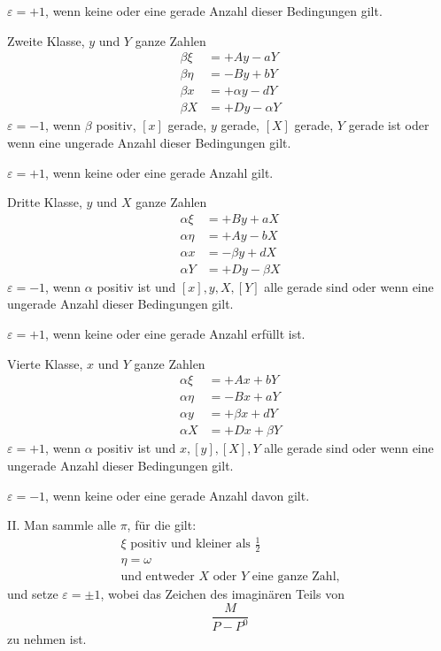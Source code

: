 $\varepsilon=+1$, wenn keine oder eine gerade Anzahl dieser Bedingungen gilt.

Zweite Klasse, $y$ und $Y$ ganze Zahlen
\[
\begin{aligned}
\beta\xi&=+Ay-aY\\
\beta\eta&=-By+bY\\
\beta x&=+\alpha y-dY\\
\beta X&=+Dy-\alpha Y
\end{aligned}
\]
$\varepsilon=-1$, wenn $\beta$ positiv, $[x]$ gerade, $y$ gerade, $[X]$ gerade, $Y$ gerade ist oder wenn eine ungerade Anzahl dieser Bedingungen gilt.

$\varepsilon=+1$, wenn keine oder eine gerade Anzahl gilt.

Dritte Klasse, $y$ und $X$ ganze Zahlen
\[
\begin{aligned}
\alpha\xi&=+By+aX\\
\alpha\eta&=+Ay-bX\\
\alpha x&=-\beta y+dX\\
\alpha Y&=+Dy-\beta X
\end{aligned}
\]
$\varepsilon=-1$, wenn $\alpha$ positiv ist und $[x],y,X,[Y]$ alle gerade sind oder wenn eine ungerade Anzahl dieser Bedingungen gilt.

$\varepsilon=+1$, wenn keine oder eine gerade Anzahl erfüllt ist.

Vierte Klasse, $x$ und $Y$ ganze Zahlen
\[
\begin{aligned}
\alpha\xi&=+Ax+bY\\
\alpha\eta&=-Bx+aY\\
\alpha y&=+\beta x+dY\\
\alpha X&=+Dx+\beta Y
\end{aligned}
\]
$\varepsilon=+1$, wenn $\alpha$ positiv ist und $x,[y],[X],Y$ alle gerade sind oder wenn eine ungerade Anzahl dieser Bedingungen gilt.

$\varepsilon=-1$, wenn keine oder eine gerade Anzahl davon gilt.

II. Man sammle alle $\pi$, für die gilt:
\[
\begin{array}{l}
\xi\text{ positiv und kleiner als }\frac12\\
\eta=\omega\\
\text{und entweder }X\text{ oder }Y\text{ eine ganze Zahl,}
\end{array}
\]
und setze $\varepsilon=\pm1$, wobei das Zeichen des imaginären Teils von
\[
\frac{M}{P-P^0}
\]
zu nehmen ist.

